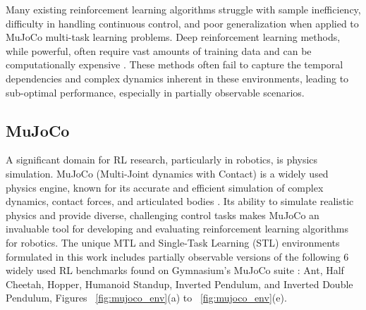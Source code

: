 \documentclass[sigconf]{acmart}
\begin{document}
Many existing reinforcement learning algorithms struggle with sample 
inefficiency, difficulty in handling continuous control, and poor 
generalization when applied to MuJoCo multi-task learning problems. 
Deep reinforcement learning methods, while powerful, often require vast 
amounts of training data and can be computationally expensive \cite{Mnih07}. These 
methods often fail to capture the temporal dependencies and complex dynamics 
inherent in these environments, leading to sub-optimal performance, especially 
in partially observable scenarios.

\subsection{MuJoCo}
A significant domain for RL research, particularly in robotics, is physics 
simulation. MuJoCo (Multi-Joint dynamics with Contact) is a widely used physics 
engine, known for its accurate and efficient simulation of complex dynamics, 
contact forces, and articulated bodies \cite{Todorov07}. Its ability to simulate realistic 
physics and provide diverse, challenging control tasks makes MuJoCo an invaluable 
tool for developing and evaluating reinforcement learning algorithms for robotics. 
The unique MTL and Single-Task Learning (STL) environments formulated in this work 
includes partially observable versions of the following 6 widely used RL benchmarks 
found on Gymnasium's MuJoCo suite \cite{Towers07}: Ant, Half Cheetah, Hopper, Humanoid Standup, 
Inverted Pendulum, and Inverted Double Pendulum, Figures ~\ref{fig:mujoco_env}(a) to ~\ref{fig:mujoco_env}(e).
\end{document}
